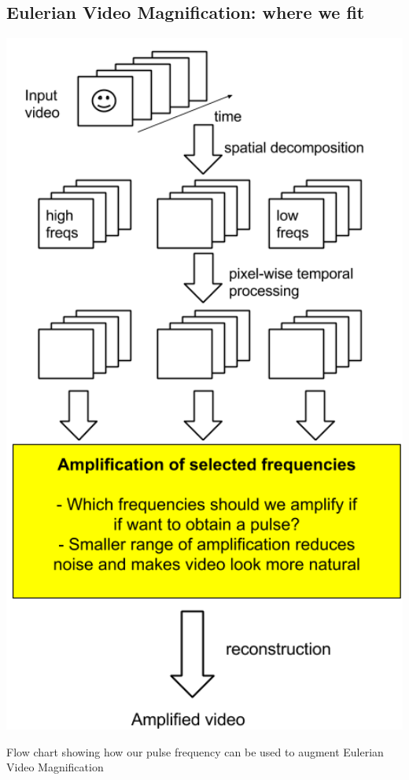 \documentclass[a0,landscape]{a0poster}
\begin{document}
\begin{multicols}{4}
 \section*{Eulerian Video Magnification: where we fit}
  \includegraphics[width=26cm]{images/EVM_where_we_fit.png}
  \caption{Flow chart showing how our pulse frequency can be used to augment Eulerian Video Magnification}
  


\end{multicols}
\end{document}

